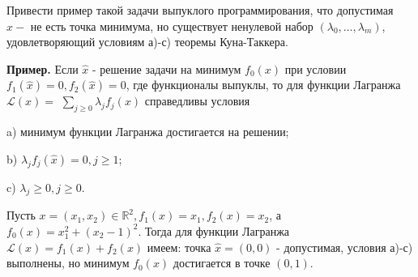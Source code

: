 \begin{task}
Привести пример такой задачи выпуклого программирования, что допустимая $\hat{x}-$ не есть точка минимума, но существует ненулевой набор $\left(\lambda_{0}, \ldots, \lambda_{m}\right)$, удовлетворяющий условиям а)-с) теоремы Куна-Таккера.

\textbf{Пример.}
Если $\hat{x}$ - решение задачи на минимум $f_{0}(x)$ при условии $f_{1}(\hat{x})=0, f_{2}(\hat{x})=0$, где функционалы выпуклы, то для функции Лагранжа $\mathcal{L}(x)=$ $\sum_{j \geq 0} \lambda_{j} f_{j}(x)$ справедливы условия

a) минимум функции Лагранжа достигается на решении;

b) $\lambda_{j} f_{j}(\hat{x})=0, j \geq 1$;

c) $\lambda_{j} \geq 0, j \geq 0$.

Пусть $x=\left(x_{1}, x_{2}\right) \in \mathbb{R}^{2}, f_{1}(x)=x_{1}, f_{2}(x)=x_{2}$, а $f_{0}(x)=x_{1}^{2}+\left(x_{2}-1\right)^{2}$. Тогда для функции Лагранжа $\mathcal{L}(x)=f_{1}(x)+f_{2}(x)$ имеем: точка $\hat{x}=(0,0)$ - допустимая, условия а)-с) выполнены, но минимум $f_{0}(x)$ достигается в точке $(0,1)$.


\end{task}
